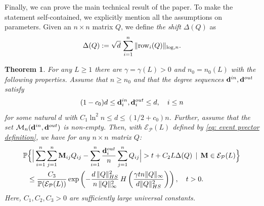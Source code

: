 \documentclass[12pt]{article}
\newtheorem{theorem}{Theorem}[section]
\theoremstyle{definition}
\theoremstyle{plain}
\newcommand{\Event}{\mathcal{E}}
\def\ranmtx{{\bf{}M}}
\def\Prob{{\mathbb P}}
\def\InDeg{{\bf d}^{in}}
\def\OutDeg{{\bf d}^{out}}
\def\MatrixSet{{\mathcal M}_n}
\def\Row{{\rm row}}
\def\pvector{{\mathcal P}}
\begin{document}
Finally, we can prove the main technical result of the paper.
To make the statement self-contained, we explicitly mention all the assumptions on parameters.
Given an $n\times n$ matrix $Q$, we define {\it the shift} $\Delta(Q)$ as
$$\Delta(Q):=\sqrt{d}\,\sum_{i=1}^n\|\Row_i(Q)\|_{\log,n}.$$
\begin{theorem}\label{th: main concentration}
For any $L\geq 1$ there are $\gamma=\gamma(L)>0$ and $n_0=n_0(L)$ with the following properties.
Assume that $n\geq n_0$ and that the degree sequences $\InDeg,\OutDeg$ satisfy
$$(1-c_0)d\leq \InDeg_i,\OutDeg_i\leq d,\quad i\leq n$$
for some natural $d$ with $C_1\ln^2 n\leq d\leq (1/2+c_0)n$.
Further, assume that the set $\MatrixSet(\InDeg,\OutDeg)$ is non-empty.
Then, with $\Event_\pvector(L)$ defined by \eqref{eq: event pvector definition},
we have for any $n\times n$ matrix $Q$:
\begin{align*}
\Prob&\Big\{\Big|\sum_{i=1}^{n}\sum_{j=1}^n
{\ranmtx}_{ij}Q_{ij}-\sum_{i=1}^n\frac{\OutDeg_{i}}{n}\sum_{j=1}^n Q_{ij}\Big|
>t+C_2L\Delta(Q)\,\mid\,{\ranmtx}\in\Event_{\pvector}(L)
\Big\}\\
&\leq \frac{C_3}{\Prob(\Event_\pvector(L))}\exp\left(-\frac{d\,\|Q\|_{HS}^2}{n\,\|Q\|_\infty^2}
\, H\left(\frac{\gamma tn\|Q\|_\infty}{d\|Q\|_{HS}^2}\right)\right),\quad t>0.
\end{align*}
Here, $C_1,C_2,C_3>0$ are sufficiently large universal constants.
\end{theorem}
\end{document}

